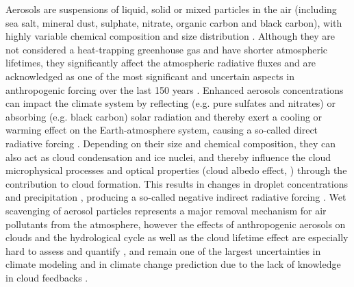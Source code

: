 Aerosols are  suspensions of liquid,  solid or mixed particles  in the
air  (including sea  salt,  mineral dust,  sulphate, nitrate,  organic
carbon and  black carbon),  with highly variable  chemical composition
and  size  distribution \citep{Putaud-2010}.   Although  they are  not
considered a heat-trapping greenhouse gas and have shorter atmospheric
lifetimes, they significantly  affect the atmospheric radiative fluxes
and  are acknowledged  as one  of the  most significant  and uncertain
aspects    in    anthropogenic    forcing    over   the    last    150
years \citep{Koch-2009,  IPCC-2013}.  Enhanced aerosols concentrations
can impact the  climate system by reflecting (e.g.   pure sulfates and
nitrates)  or  absorbing  (e.g.   black carbon)  solar  radiation  and
thereby  exert a  cooling or  warming effect  on  the Earth-atmosphere
system,      causing       a      so-called      direct      radiative
forcing     \citep{Charlson-1991,    Haywood-2000,    Ramanathan-2001,
Liao-2005, Bangert-2012, Lundgren-2013}.   Depending on their size and
chemical composition, they can also  act as cloud condensation and ice
nuclei, and  thereby influence  the cloud microphysical  processes and
optical   properties  (cloud  albedo   effect,  \citealp{Twomey-1977})
through the contribution to  cloud formation.  This results in changes
in      droplet      concentrations     \citep{Albrecht-1989}      and
precipitation     \citep{Rosenfeld-2000,    Khain-2008,    Khain-2009,
Pruppacher-2010,   Seifert-2012,  Tao-2012,  Lee-2012},   producing  a
so-called  negative  indirect  radiative forcing  \citep{Haywood-2000,
Lohmann-2005,  VandenHeever-2011, Rosenfeld-2013}.  Wet  scavenging of
aerosol  particles  represents  a  major  removal  mechanism  for  air
pollutants from  the atmosphere, however the  effects of anthropogenic
aerosols on  clouds and  the hydrological cycle  as well as  the cloud
lifetime    effect    are    especially    hard    to    assess    and
quantify   \citep{IPCC-2013},   and   remain   one  of   the   largest
uncertainties in climate modeling and in climate change prediction due
to  the lack  of  knowledge in  cloud feedbacks  \citep{Sherwood-2013,
Rosenfeld-2013, Lee-2013}.

